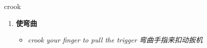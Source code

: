 
\begin{frame}
{\huge crook}
\begin{center}
\begin{enumerate}\Large
  \item \textbf{使弯曲}
  \begin{itemize}
    \item \em{\Large{crook your finger to pull the trigger 弯曲手指来扣动扳机}}
  \end{itemize}
\end{enumerate}
\end{center}
\end{frame}
